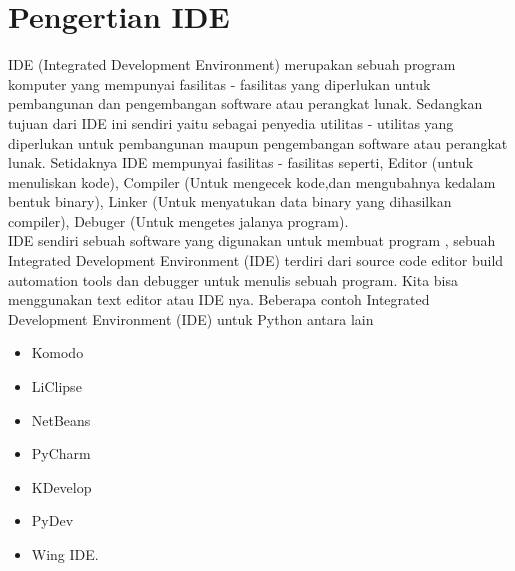 


\section {Pengertian IDE}
	IDE (Integrated Development Environment) merupakan sebuah program komputer yang mempunyai fasilitas - fasilitas yang diperlukan untuk pembangunan dan pengembangan software atau perangkat lunak. Sedangkan tujuan dari IDE ini sendiri yaitu sebagai penyedia utilitas - utilitas yang diperlukan untuk pembangunan maupun pengembangan software atau perangkat lunak. Setidaknya IDE mempunyai fasilitas - fasilitas seperti, Editor (untuk menuliskan kode), Compiler (Untuk mengecek kode,dan mengubahnya kedalam bentuk binary), Linker (Untuk menyatukan data binary yang dihasilkan compiler), Debuger (Untuk mengetes jalanya program).\\

	IDE sendiri sebuah software yang digunakan untuk membuat program , sebuah Integrated Development Environment (IDE) terdiri dari source code editor build automation tools dan debugger untuk menulis sebuah program. Kita bisa menggunakan text editor atau IDE nya. 
Beberapa contoh Integrated Development Environment (IDE) untuk Python antara lain \\
\begin{itemize}
\item Komodo
\item LiClipse
\item NetBeans
\item PyCharm
\item KDevelop
\item PyDev
\item Wing IDE\cite{aripurnamayana2012rancangan}.
\end{itemize}

